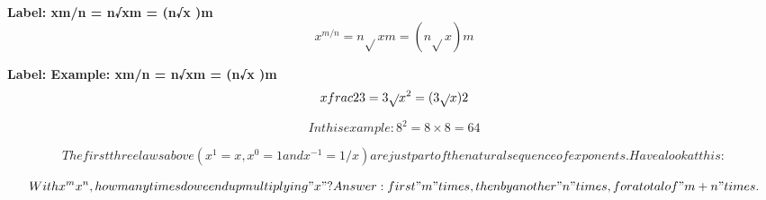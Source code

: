 \textbf{Label: xm/n = n√xm = (n√x )m}
\[x^{m/n} = n\sqrt{}xm = (n\sqrt{}x )m\]

\textbf{Label: Example: xm/n = n√xm = (n√x )m}
\[x\\frac{2}{3} = 3\sqrt{}x^{2} = (3\sqrt{}x )2\]

\[In this example: 8^{2} = 8 \times 8 = 64\]

\[The first three laws above (x^{1} = x, x^{0} = 1 and x^{-1} = 1/x) are just part of the natural sequence of exponents. Have a look at this:\]

\[With x^{m}x^{n}, how many times do we end up multiplying "x"? Answer: first "m" times, then by another "n" times, for a total of "m+n" times.\]

